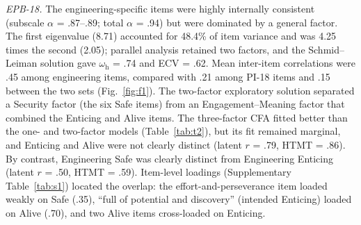 \documentclass[journal,a4paper]{IEEEtran}
\begin{document}
\textit{EPB-18.} The engineering-specific items were highly internally consistent (subscale $\alpha$ = .87–.89; total $\alpha$ = .94) but were dominated by a general factor. The first eigenvalue (8.71) accounted for 48.4\% of item variance and was 4.25 times the second (2.05); parallel analysis retained two factors, and the Schmid–Leiman solution gave $\omega _{\mathrm{h}}$ = .74 and ECV = .62. Mean inter-item correlations were .45 among engineering items, compared with .21 among PI-18 items and .15 between the two sets (Fig.~\ref{fig:f1}). The two-factor exploratory solution separated a Security factor (the six Safe items) from an Engagement–Meaning factor that combined the Enticing and Alive items. The three-factor CFA fitted better than the one- and two-factor models (Table~\ref{tab:t2}), but its fit remained marginal, and Enticing and Alive were not clearly distinct (latent $r$ = .79, HTMT = .86). By contrast, Engineering Safe was clearly distinct from Engineering Enticing (latent $r$ = .50, HTMT = .59). Item-level loadings (Supplementary Table~\ref{tab:s1}) located the overlap: the effort-and-perseverance item loaded weakly on Safe (.35), ``full of potential and discovery'' (intended Enticing) loaded on Alive (.70), and two Alive items cross-loaded on Enticing.
\end{document}
